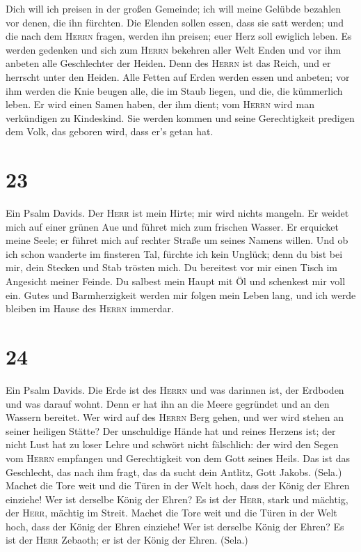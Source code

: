  Dich will ich preisen in der großen Gemeinde; ich will
meine Gelübde bezahlen vor denen, die ihn fürchten.  Die
Elenden sollen essen, dass sie satt werden; und die nach dem
\textsc{Herrn} fragen, werden ihn preisen; euer Herz soll ewiglich
leben.  Es werden gedenken und sich zum \textsc{Herrn}
bekehren aller Welt Enden und vor ihm anbeten alle Geschlechter der
Heiden.  Denn des \textsc{Herrn} ist das Reich, und er
herrscht unter den Heiden.  Alle Fetten auf Erden werden
essen und anbeten; vor ihm werden die Knie beugen alle, die im Staub
liegen, und die, die kümmerlich leben.  Er wird einen
Samen haben, der ihm dient; vom \textsc{Herrn} wird man verkündigen zu
Kindeskind.  Sie werden kommen und seine Gerechtigkeit
predigen dem Volk, das geboren wird, dass er's getan hat.

\hypertarget{section-22}{%
\section{23}\label{section-22}}

 Ein Psalm Davids. Der \textsc{Herr} ist mein Hirte; mir
wird nichts mangeln.  Er weidet mich auf einer grünen Aue
und führet mich zum frischen Wasser.  Er erquicket meine
Seele; er führet mich auf rechter Straße um seines Namens willen.
 Und ob ich schon wanderte im finsteren Tal, fürchte ich
kein Unglück; denn du bist bei mir, dein Stecken und Stab trösten mich.
 Du bereitest vor mir einen Tisch im Angesicht meiner
Feinde. Du salbest mein Haupt mit Öl und schenkest mir voll ein.
 Gutes und Barmherzigkeit werden mir folgen mein Leben
lang, und ich werde bleiben im Hause des \textsc{Herrn} immerdar.

\hypertarget{section-23}{%
\section{24}\label{section-23}}

 Ein Psalm Davids. Die Erde ist des \textsc{Herrn} und was
darinnen ist, der Erdboden und was darauf wohnt.  Denn er
hat ihn an die Meere gegründet und an den Wassern bereitet.
 Wer wird auf des \textsc{Herrn} Berg gehen, und wer wird
stehen an seiner heiligen Stätte?  Der unschuldige Hände
hat und reines Herzens ist; der nicht Lust hat zu loser Lehre und
schwört nicht fälschlich:  der wird den Segen vom
\textsc{Herrn} empfangen und Gerechtigkeit von dem Gott seines Heils.
 Das ist das Geschlecht, das nach ihm fragt, das da sucht
dein Antlitz, Gott Jakobs. (Sela.)  Machet die Tore weit
und die Türen in der Welt hoch, dass der König der Ehren einziehe!
 Wer ist derselbe König der Ehren? Es ist der
\textsc{Herr}, stark und mächtig, der \textsc{Herr}, mächtig im Streit.
 Machet die Tore weit und die Türen in der Welt hoch, dass
der König der Ehren einziehe!  Wer ist derselbe König der
Ehren? Es ist der \textsc{Herr} Zebaoth; er ist der König der Ehren.
(Sela.)

